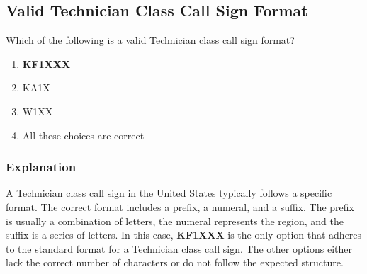 \subsection{Valid Technician Class Call Sign Format}
\label{T1C05}

\begin{tcolorbox}[colback=gray!10!white,colframe=black!75!black,title=T1C05]
Which of the following is a valid Technician class call sign format?
\begin{enumerate}[label=\Alph*,noitemsep]
    \item \textbf{KF1XXX}
    \item KA1X
    \item W1XX
    \item All these choices are correct
\end{enumerate}
\end{tcolorbox}

\subsubsection*{Explanation}
A Technician class call sign in the United States typically follows a specific format. The correct format includes a prefix, a numeral, and a suffix. The prefix is usually a combination of letters, the numeral represents the region, and the suffix is a series of letters. In this case, \textbf{KF1XXX} is the only option that adheres to the standard format for a Technician class call sign. The other options either lack the correct number of characters or do not follow the expected structure.